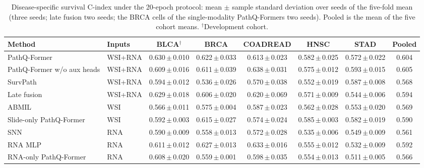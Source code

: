 \documentclass{article}
\newcommand{\pq}{PathQ-Former}
\newcommand{\cindex}{C-index}
\newcommand{\pmv}[2]{#1\,$\pm$\,#2}
\begin{document}
\begin{table}[t]
\caption{Disease-specific survival \cindex{} under the 20-epoch protocol: mean $\pm$ sample standard deviation over seeds of the five-fold mean (three seeds; late fusion two seeds; the BRCA cells of the single-modality \pq{}s two seeds). Pooled is the mean of the five cohort means. $^\dagger$Development cohort.}
\label{tab:acc}
\centering
\footnotesize
\setlength{\tabcolsep}{3pt}
\begin{tabular}{@{}llcccccc@{}}
\toprule
Method & Inputs & BLCA$^\dagger$ & BRCA & COADREAD & HNSC & STAD & Pooled \\
\midrule
\pq{} & WSI+RNA & \pmv{0.630}{0.010} & \pmv{0.622}{0.033} & \pmv{0.613}{0.023} & \pmv{0.582}{0.025} & \pmv{0.572}{0.022} & 0.604 \\
\pq{} w/o aux heads & WSI+RNA & \pmv{0.609}{0.016} & \pmv{0.611}{0.039} & \pmv{0.638}{0.031} & \pmv{0.575}{0.012} & \pmv{0.593}{0.015} & 0.605 \\
SurvPath & WSI+RNA & \pmv{0.594}{0.012} & \pmv{0.536}{0.026} & \pmv{0.570}{0.038} & \pmv{0.552}{0.019} & \pmv{0.587}{0.008} & 0.568 \\
Late fusion & WSI+RNA & \pmv{0.629}{0.018} & \pmv{0.606}{0.020} & \pmv{0.620}{0.069} & \pmv{0.571}{0.009} & \pmv{0.544}{0.006} & 0.594 \\
ABMIL & WSI & \pmv{0.566}{0.011} & \pmv{0.575}{0.004} & \pmv{0.587}{0.023} & \pmv{0.562}{0.028} & \pmv{0.553}{0.020} & 0.569 \\
Slide-only \pq{} & WSI & \pmv{0.592}{0.003} & \pmv{0.615}{0.027} & \pmv{0.574}{0.024} & \pmv{0.585}{0.003} & \pmv{0.582}{0.019} & 0.590 \\
SNN & RNA & \pmv{0.590}{0.009} & \pmv{0.558}{0.013} & \pmv{0.572}{0.028} & \pmv{0.535}{0.006} & \pmv{0.549}{0.009} & 0.561 \\
RNA MLP & RNA & \pmv{0.611}{0.012} & \pmv{0.627}{0.013} & \pmv{0.633}{0.016} & \pmv{0.555}{0.012} & \pmv{0.532}{0.009} & 0.592 \\
RNA-only \pq{} & RNA & \pmv{0.608}{0.020} & \pmv{0.559}{0.001} & \pmv{0.598}{0.035} & \pmv{0.554}{0.013} & \pmv{0.511}{0.005} & 0.566 \\
\bottomrule
\end{tabular}
\end{table}
\end{document}
